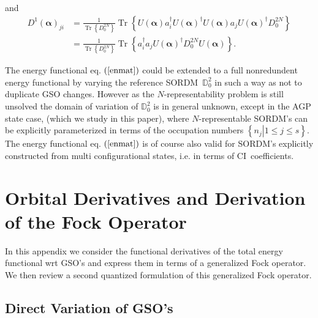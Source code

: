 \documentclass[titlepage]{article}%
\begin{document}
and
\begin{align}
D^{1}\left(  \bm{\alpha}\right)  _{ji}  &  =\frac{1}{\operatorname{Tr}\left\{
D_{0}^{2N}\right\}  }\operatorname{Tr}\left\{  U\left(  \bm{\alpha}\right)
a_{i}^{\dagger}U\left(  \bm{\alpha}\right)  ^{\dagger}U\left(
\bm{\alpha}\right)  a_{j}U\left(  \bm{\alpha }\right)  ^{\dagger}D_{0}%
^{2N}\right\} \nonumber\\
&  =\frac{1}{\operatorname{Tr}\left\{  D_{0}^{2N}\right\}  }\operatorname{Tr}%
\left\{  a_{i}^{\dagger}a_{j}U\left(  \bm{\alpha}\right)  ^{\dagger}D_{0}%
^{2N}U\left(  \bm{\alpha}\right)  \right\}  .
\end{align}


The energy functional eq. $\left(  \ref{enmat}\right)  $ could be extended to
a full nonredundent energy functional by varying the reference
SORDM\ $\mathbb{D}_{0}^{2}$ in such a way as not to duplicate GSO changes.
However as the $N$-representability problem is still unsolved the domain of
variation of $\mathbb{D}_{0}^{2}$ is in general unknown, except in the AGP
state case, (which we study in this paper), where $N$-representable SORDM's
can be explicitly parameterized in terms of the occupation numbers $\left\{
\left.  n_{j}\right\vert 1\leq j\leq s\right\}  $. The energy functional eq.
$\left(  \ref{enmat}\right)  $ is of course also valid for SORDM's explicitly
constructed from multi configurational states, i.e. in terms of CI\ coefficients.

\section{Orbital Derivatives and Derivation of the Fock
Operator\label{Deriv_Fock}}

In this appendix we consider the functional derivatives of the total energy
functional wrt GSO's and express them in terms of a generalized Fock operator.
We then review a second quantized formulation of this generalized Fock operator.

\subsection{Direct Variation of GSO's}
\end{document}
